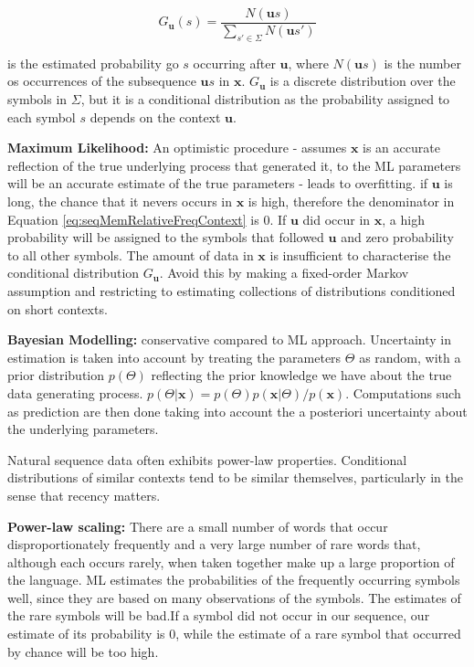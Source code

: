 \begin{equation}
G_{\textbf{u}}(s)=\frac{N(\textbf{u}s)}{\sum_{s' \in \Sigma}N(\textbf{u}s')}
\label{eq:seqMemRelativeFreqContext}
\end{equation}

\noindent is the estimated probability go $s$ occurring after $\textbf{u}$, where $N(\textbf{u}s)$ is the number os occurrences of the subsequence $\textbf{u}s$ in $\textbf{x}$. $G_{\textbf{u}}$ is a discrete distribution over the symbols in $\Sigma$, but it is a conditional distribution as the probability assigned to each symbol $s$ depends on the context $\textbf{u}$.

\textbf{Maximum Likelihood:} An optimistic procedure - assumes $\textbf{x}$ is an accurate reflection of the true underlying process that generated it, to the ML parameters will be an accurate estimate of the true parameters - leads to overfitting. if $\textbf{u}$ is long, the chance that it nevers occurs in $\textbf{x}$ is high, therefore the denominator in Equation \ref{eq:seqMemRelativeFreqContext} is 0. If $\textbf{u}$ did occur in $\textbf{x}$, a high probability will be assigned to the symbols that followed $\textbf{u}$ and zero probability to all other symbols. The amount of data in $\textbf{x}$ is insufficient to characterise the conditional distribution $G_{\textbf{u}}$. Avoid this by making a fixed-order Markov assumption and restricting to estimating collections of distributions conditioned on short contexts.

\textbf{Bayesian Modelling:} conservative compared to ML approach. Uncertainty in estimation is taken into account by treating the parameters $\Theta$ as random, with a prior distribution $p(\Theta)$ reflecting the prior knowledge we have about the true data generating process. $p(\Theta | \textbf{x})=p(\Theta)p(\textbf{x}|\Theta)/p(\textbf{x})$. Computations such as prediction are then done taking into account the a posteriori uncertainty about the underlying parameters.

Natural sequence data often exhibits power-law properties. Conditional distributions of similar contexts tend to be similar themselves, particularly in the sense that recency matters.

\textbf{Power-law scaling:} There are a small number of words that occur disproportionately frequently and a very large number of rare words that, although each occurs rarely, when taken together make up a large proportion of the language. ML estimates the probabilities of the frequently occurring symbols well, since they are based on many observations of the symbols. The estimates of the rare symbols will be bad.If a symbol did not occur in our sequence, our estimate of its probability is 0, while the estimate of a rare symbol that occurred by chance will be too high.

